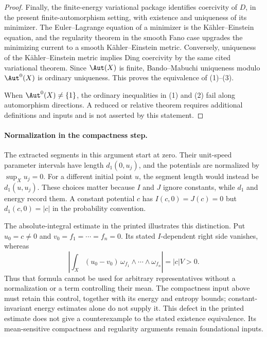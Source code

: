 \begin{proof}
Finally, the finite-energy variational package
\cite[Lemma~2.8, Theorem~2.19, Lemma~2.20, and
Corollary~5.2]{BBJ21} identifies coercivity of $D$, in the present
finite-automorphism setting, with existence and uniqueness of its minimizer.
The Euler--Lagrange
equation of a minimizer is the K\"ahler--Einstein equation, and the
regularity theorem in the smooth Fano case upgrades the minimizing current
to a smooth K\"ahler--Einstein metric.  Conversely, uniqueness of the
K\"ahler--Einstein metric implies Ding coercivity by the same cited
variational theorem.  Since $\Aut(X)$ is finite, Bando--Mabuchi
uniqueness modulo $\Aut^0(X)$ is ordinary uniqueness.  This proves the
equivalence of (1)--(3).

When $\Aut^0(X)\neq\{1\}$, the ordinary inequalities in (1) and (2)
fail along automorphism directions.  A reduced or relative theorem requires
additional definitions and inputs and is not asserted by this statement.
\end{proof}

\paragraph{Normalization in the compactness step.}
The extracted segments in this argument start at zero. Their
unit-speed parameter intervals have length $d_1(0,u_j)$,
and the potentials are normalized by $\sup_Xu_j=0$.
For a different initial point $u$, the segment length would
instead be $d_1(u,u_j)$. These choices matter because $I$
and $J$ ignore constants, while $d_1$ and energy record them.
A constant potential $c$ has $I(c,0)=J(c)=0$ but
$d_1(c,0)=|c|$ in the probability convention.

The absolute-integral estimate in the printed
\cite[Lemma~A.2]{BBJ21} illustrates this distinction. Put
$u_0=c\ne0$ and $v_0=f_1=\cdots=f_n=0$. Its stated
$I$-dependent right side vanishes, whereas
\[
 \left|\int_X(u_0-v_0)\,
             \omega_{f_1}\wedge\cdots\wedge\omega_{f_n}\right|
       =|c|V>0.
\]
Thus that formula cannot be used for arbitrary representatives
without a normalization or a term controlling their mean.
The compactness input above must retain this control, together
with its energy and entropy bounds; constant-invariant energy
estimates alone do not supply it. This defect in the printed
estimate does not give a counterexample to the stated
existence equivalence. Its mean-sensitive compactness and
regularity arguments remain foundational inputs.

